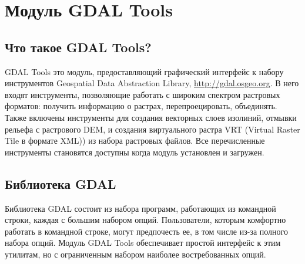 
\section{Модуль GDAL Tools}\label{label_plugingdaltools}


\subsection{Что такое GDAL Tools?}\label{whatsgdal}
GDAL Tools это модуль, предоставляющий графический интерфейс к набору
инструментов Geospatial Data Abstraction Library, \url{http://gdal.osgeo.org}.
В него входят инструменты, позволяющие работать с широким спектром растровых
форматов: получить информацию о растрах, перепроецировать, объединять.
Также включены инструменты для создания векторных слоев изолиний, отмывки
рельефа с растрового DEM, и создания виртуального растра VRT (Virtual Raster
Tile в формате XML)) из набора растровых файлов. Все перечисленные инструменты
становятся доступны когда модуль установлен и загружен.

\subsection{Библиотека GDAL}\label{gdal_lib}
Библиотека GDAL состоит из набора программ, работающих из командной строки,
каждая с большим набором опций. Пользователи, которым комфортно работать в
командной строке, могут предпочесть ее, в том числе из-за полного набора
опций. Модуль GDAL Tools обеспечивает простой интерфейс к этим утилитам,
но с ограниченным набором наиболее востребованных опций.

